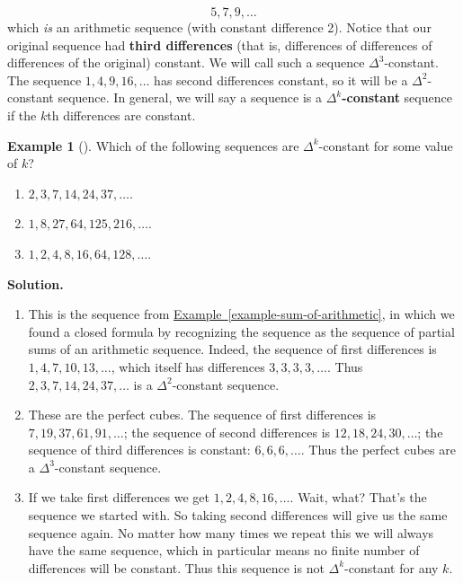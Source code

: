 \documentclass[12pt,]{book}
\newcommand{\terminology}[1]{\textbf{#1}}
\theoremstyle{plain}
\theoremstyle{definition}
\theoremstyle{definition}
\newtheorem{example}[theorem]{Example}
\theoremstyle{definition}
\numberwithin{equation}{chapter}
\begin{document}
\begin{equation*}
5, 7, 9, \ldots
\end{equation*}
which \emph{is} an arithmetic sequence (with constant difference 2). Notice that our original sequence had \terminology{third differences} (that is, differences of differences of differences of the original) constant. We will call such a sequence \(\Delta^3\)-constant. The sequence \(1, 4, 9, 16, \ldots\) has second differences constant, so it will be a \(\Delta^2\)-constant sequence. In general, we will say a sequence is a \terminology{\(\Delta^k\)-constant}\label{notation-4}
 sequence if the \(k\)th differences are constant.%
\begin{example}[]\label{example-deltak}
\hypertarget{p-230}{}%
Which of the following sequences are \(\Delta^k\)-constant for some value of \(k\)? \leavevmode%
\begin{enumerate}
\item\hypertarget{li-149}{}\(2, 3, 7, 14, 24, 37,\ldots\).%
\item\hypertarget{li-150}{}\(1, 8, 27, 64, 125, 216, \ldots\).%
\item\hypertarget{li-151}{}\(1,2,4,8,16,64,128,\ldots\).%
\end{enumerate}
%
\par\smallskip%
\noindent\textbf{Solution.}\hypertarget{solution-25}{}\quad%
\hypertarget{p-231}{}%
\leavevmode%
\begin{enumerate}
\item\hypertarget{li-152}{}This is the sequence from \hyperref[example-sum-of-arithmetic]{Example~\ref{example-sum-of-arithmetic}}, in which we found a closed formula by recognizing the sequence as the sequence of partial sums of an arithmetic sequence. Indeed, the sequence of first differences is \(1,4,7, 10, 13,\ldots\), which itself has differences \(3,3,3,3,\ldots\). Thus \(2, 3, 7, 14, 24, 37,\ldots\) is a \(\Delta^2\)-constant sequence.%
\item\hypertarget{li-153}{}These are the perfect cubes. The sequence of first differences is \(7, 19, 37, 61, 91, \ldots\); the sequence of second differences is \(12, 18, 24, 30,\ldots\); the sequence of third differences is constant: \(6,6,6,\ldots\). Thus the perfect cubes are a \(\Delta^3\)-constant sequence.%
\item\hypertarget{li-154}{}If we take first differences we get \(1,2,4,8,16,\ldots\). Wait, what? That's the sequence we started with. So taking second differences will give us the same sequence again. No matter how many times we repeat this we will always have the same sequence, which in particular means no finite number of differences will be constant. Thus this sequence is not \(\Delta^k\)-constant for any \(k\).%
\end{enumerate}
%
\end{example}
\end{document}
